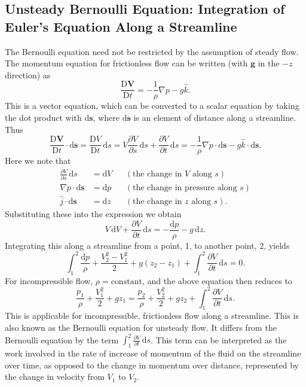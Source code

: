 \subsection{Unsteady Bernoulli Equation: Integration of Euler's Equation Along a Streamline}
The Bernoulli equation need not be restricted by the assumption of steady flow. The momentum equation for frictionless flow can be written (with $\textbf{g}$ in the $-z$ direction) as
\[ 
\frac{\mathrm{D}\textbf{V}}{\mathrm{D}t} = - \frac{1}{\rho} \nabla  p - g \hat{k}
.\]
This is a vector equation, which can be converted to a scalar equation by taking the dot product with $\mathrm{d}\textbf{s}$, where $\mathrm{d}\textbf{s}$ is an element of distance along a streamline. Thus
\[ 
\frac{\mathrm{D}\textbf{V}}{\mathrm{D}t} \cdot \mathrm{d}\textbf{s} = \frac{\mathrm{D}V}{\mathrm{D}t} \, \mathrm{d}s = V \frac{\partial V}{\partial s} \, \mathrm{d}s + \frac{\partial V}{\partial t} \, \mathrm{d}s = - \frac{1}{\rho} \nabla p \cdot \mathrm{d} \textbf{s} - g \hat{k} \cdot \mathrm{d} \textbf{s}
.\]
Here we note that
\begin{align*}
  \frac{\partial V}{\partial s} \, \mathrm{d}s &= \mathrm{d}V & &(\text{the change in } V \text{ along }s)\\
  \nabla p \cdot \mathrm{d}\textbf{s} &= \mathrm{d}p & &(\text{the change in pressure along }s) \\
  \hat{j} \cdot \mathrm{d}\textbf{s} &= \mathrm{d}z & &(\text{the change in }z \text{ along }s)
.\end{align*}
Substituting these into the expression we obtain
\[ 
V \, \mathrm{d}V + \frac{\partial V}{\partial t} \, \mathrm{d}s = - \frac{\mathrm{d}p}{\rho} - g \, \mathrm{d}z
.\]
Integrating this along a streamline from a point, 1, to another point, 2, yields
\[ 
\int_{1}^{2} \frac{\mathrm{d}p}{\rho} + \frac{V_2^2 - V_1^2}{2} + g \left( z_2 - z_1 \right) + \int_{1}^{2} \frac{\partial V}{\partial t} \, \mathrm{d}s = 0
.\]
For incompressible flow, $\rho = \mathrm{constant}$, and the above equation then reduces to
\[ 
\frac{p_1}{\rho} + \frac{V_1^2}{2} + gz_1 = \frac{p_2}{\rho} + \frac{V_2^2}{2} + gz_2 + \int_{1}^{2} \frac{\partial V}{\partial t} \, \mathrm{d}s
.\]
This is applicable for incompressible, frictionless flow along a streamline. This is also known as the Bernoulli equation for unsteady flow. It differs from the Bernoulli equation by the term $\int_{1}^{2} \frac{\partial V}{\partial t} \, \mathrm{d}s$. This term can be interpreted as the work involved in the rate of increase of momentum of the fluid on the streamline over time, as opposed to the change in momentum over distance, represented by the change in velocity from $V_1$ to $V_2$.


